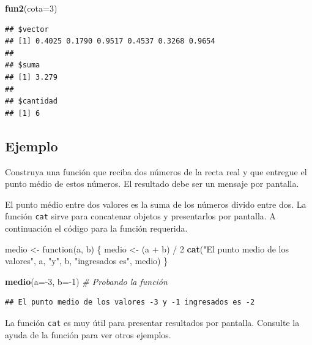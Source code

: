 \documentclass[10pt,]{krantz}
\makeatletter
\newenvironment{Shaded}{\begin{snugshade}}{\end{snugshade}}
\newcommand{\KeywordTok}[1]{\textcolor[rgb]{0.13,0.29,0.53}{\textbf{{#1}}}}
\newcommand{\DataTypeTok}[1]{\textcolor[rgb]{0.13,0.29,0.53}{{#1}}}
\newcommand{\DecValTok}[1]{\textcolor[rgb]{0.00,0.00,0.81}{{#1}}}
\newcommand{\StringTok}[1]{\textcolor[rgb]{0.31,0.60,0.02}{{#1}}}
\newcommand{\CommentTok}[1]{\textcolor[rgb]{0.56,0.35,0.01}{\textit{{#1}}}}
\newcommand{\NormalTok}[1]{{#1}}
\newenvironment{kframe}{%
\medskip{}
\setlength{\fboxsep}{.8em}
 \def\at@end@of@kframe{}%
 \ifinner\ifhmode%
  \def\at@end@of@kframe{\end{minipage}}%
  \begin{minipage}{\columnwidth}%
 \fi\fi%
 \def\FrameCommand##1{\hskip\@totalleftmargin \hskip-\fboxsep
 \colorbox{shadecolor}{##1}\hskip-\fboxsep
     \hskip-\linewidth \hskip-\@totalleftmargin \hskip\columnwidth}%
 \MakeFramed {\advance\hsize-\width
   \@totalleftmargin\z@ \linewidth\hsize
   \@setminipage}}%
 {\par\unskip\endMakeFramed%
 \at@end@of@kframe}
\renewenvironment{Shaded}{\begin{kframe}}{\end{kframe}}
\let\BeginKnitrBlock\begin \let\EndKnitrBlock\end
\makeatother
\begin{document}
\begin{Shaded}
\begin{Highlighting}[]
\KeywordTok{fun2}\NormalTok{(}\DataTypeTok{cota=}\DecValTok{3}\NormalTok{)}
\end{Highlighting}
\end{Shaded}

\begin{verbatim}
## $vector
## [1] 0.4025 0.1790 0.9517 0.4537 0.3268 0.9654
## 
## $suma
## [1] 3.279
## 
## $cantidad
## [1] 6
\end{verbatim}

\subsection*{Ejemplo}\label{ejemplo-18}


Construya una función que reciba dos números de la recta real y que
entregue el punto médio de estos números. El resultado debe ser un
mensaje por pantalla.

El punto médio entre dos valores es la suma de los números divido entre
dos. La función \texttt{cat} sirve para concatenar objetos y
presentarlos por pantalla. A continuación el código para la función
requerida.

\begin{Shaded}
\begin{Highlighting}[]
\NormalTok{medio <-}\StringTok{ }\NormalTok{function(a, b) \{}
  \NormalTok{medio <-}\StringTok{ }\NormalTok{(a +}\StringTok{ }\NormalTok{b) /}\StringTok{ }\DecValTok{2}
  \KeywordTok{cat}\NormalTok{(}\StringTok{"El punto medio de los valores"}\NormalTok{,}
      \NormalTok{a, }\StringTok{"y"}\NormalTok{, b,}
      \StringTok{"ingresados es"}\NormalTok{, medio)}
\NormalTok{\}}

\KeywordTok{medio}\NormalTok{(}\DataTypeTok{a=}\NormalTok{-}\DecValTok{3}\NormalTok{, }\DataTypeTok{b=}\NormalTok{-}\DecValTok{1}\NormalTok{)  }\CommentTok{# Probando la función}
\end{Highlighting}
\end{Shaded}

\begin{verbatim}
## El punto medio de los valores -3 y -1 ingresados es -2
\end{verbatim}

\BeginKnitrBlock{rmdnote}
La función \texttt{cat} es muy útil para presentar resultados por
pantalla. Consulte la ayuda de la función para ver otros ejemplos.
\EndKnitrBlock{rmdnote}
\end{document}
